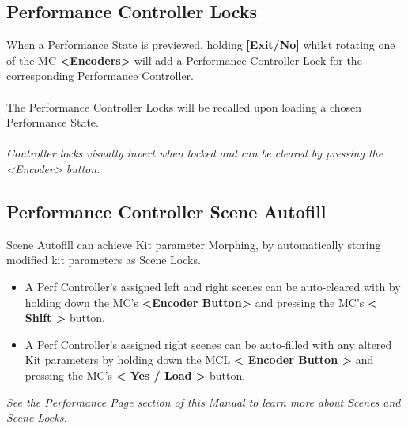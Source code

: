 \subsection{Performance Controller Locks}
When a Performance State is previewed, holding \textbf{[Exit/No]} whilst rotating one of the MC \textbf{<Encoders>} will add a Performance Controller Lock for the corresponding Performance Controller.
\\\\The Performance Controller Locks will be recalled upon loading a chosen Performance State.
\\\\
\textit{Controller locks visually invert when locked and can be cleared by pressing the <Encoder> button.
}
\newpage
\subsection{Performance Controller Scene Autofill}
Scene Autofill can achieve Kit parameter Morphing, by automatically storing modified kit parameters as Scene Locks.
\begin{itemize}
    \item A Perf Controller's assigned left and right scenes can be auto-cleared with by holding down the MC's \textbf{<Encoder Button>} and pressing the MC's \textbf{< Shift >} button.
    \item A Perf Controller's assigned right scenes can be auto-filled with any altered Kit parameters by holding down the MCL \textbf{< Encoder Button >} and pressing the MC's \textbf{< Yes / Load >} button.
\end{itemize}
\textit{See the Performance Page section of this Manual to learn more about Scenes and Scene Locks.}




